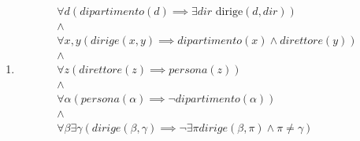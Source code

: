 \documentclass{article}
\begin{document}
\begin{enumerate}
        \item \begin{equation}
            \begin{gathered}
                \forall d (dipartimento(d) \implies \exists dir \text{ dirige}(d,dir)) %
                \\\land\\
                \forall x,y (dirige(x,y) \implies dipartimento(x) \land direttore(y))
                \\\land\\
                \forall z (direttore(z) \implies persona(z))
                \\\land\\
                \forall \alpha (persona(\alpha) \implies \neg dipartimento(\alpha))
                \\\land\\
                \forall \beta \exists \gamma (dirige(\beta,\gamma) \implies \neg \exists \pi dirige(\beta,\pi) \land \pi\not =\gamma)
            \end{gathered}
        \end{equation}
    
    \end{enumerate}
\end{document}
